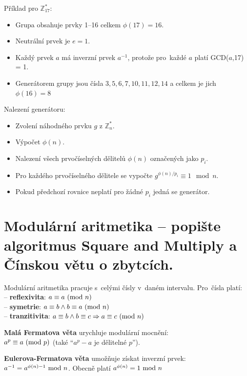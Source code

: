 Příklad pro $\mathbb{Z}^*_{17}$:
\begin{itemize}[noitemsep]
    \item Grupa obsahuje prvky 1--16 celkem $\phi(17) = 16$.
    \item Neutrální prvek je $e = 1$.
    \item Každý prvek $a$ má inverzní prvek $a^{-1}$, protože pro~každé $a$ platí GCD($a$,17) = 1.
    \item Generátorem grupy jsou čísla $3,5,6,7,10,11,12,14$ a celkem je jich $\phi(16) = 8$
\end{itemize}

Nalezení generátoru:
\begin{itemize}[noitemsep]
    \item Zvolení náhodného prvku $g$ z $\mathbb{Z}_n^*$.
    \item Výpočet $\phi(n)$.
    \item Nalezení všech prvočíselných dělitelů $\phi(n)$ označených jako $p_i$.
    \item Pro každého prvočíselného dělitele se vypočte $g^{\phi(n)/p_i} \equiv 1 \mod n$.
    \item Pokud předchozí rovnice neplatí pro žádné $p_i$ jedná se generátor.
\end{itemize}

\clearpage
\section{Modulární aritmetika -- popište algoritmus Square and Multiply a Čínskou větu o zbytcích.}

Modulární aritmetika pracuje s~celými čísly v~daném intervalu. Pro~čísla platí: \\
-- \textbf{reflexivita}: $a \equiv a \ (\mathrm{mod}\ n)$ \\
-- \textbf{symetrie}: $a \equiv b \wedge b \equiv a \ (\mathrm{mod}\ n)$ \\
-- \textbf{tranzitivita}: $a \equiv b \wedge b \equiv c \Rightarrow a \equiv c \ (\mathrm{mod}\ n)$

\vspace*{1em} \noindent
\textbf{Malá Fermatova věta} urychluje modulární mocnění: \\
$a^p \equiv a \ (\mathrm{mod}\ p)$ (také \enquote{$a^p - a$ je dělitelné $p$}).

\vspace*{1em} \noindent
\textbf{Eulerova-Fermatova věta} umožňuje získat inverzní prvek: \\
$a^{-1} = a^{\phi(n) - 1} \ \mathrm{mod}\ n$. Obecně platí $a^{\phi(n)} = 1 \ \mathrm{mod}\ n$

